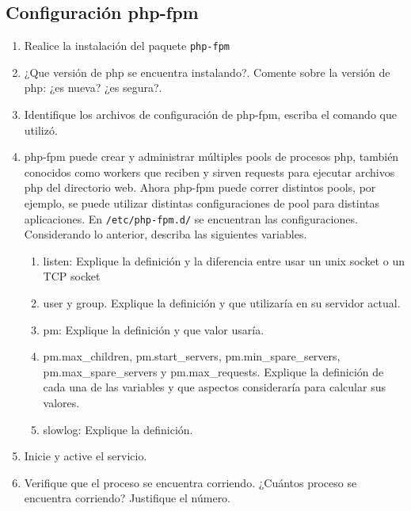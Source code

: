 \documentclass[11pt]{exam}
\begin{document}
\subsection{Configuración php-fpm}
\begin{enumerate}
	\item Realice la instalación del paquete \texttt{php-fpm}
	\item ¿Que versión de php se encuentra instalando?. Comente sobre la versión de php: ¿es nueva? ¿es segura?.
	\vspace{0.9in}
	\item Identifique los archivos de configuración de php-fpm, escriba el comando que utilizó.
	\vspace{0.9in}
	\item php-fpm puede crear y administrar múltiples pools de procesos php, también conocidos como workers que reciben y sirven requests para ejecutar archivos php del directorio web. Ahora php-fpm puede correr distintos pools, por ejemplo, se puede utilizar distintas configuraciones de pool para distintas aplicaciones. En \texttt{/etc/php-fpm.d/} se encuentran las configuraciones. Considerando lo anterior, describa las siguientes variables.
	\begin{enumerate}
		\item listen: Explique la definición y la diferencia entre usar un unix socket o un TCP socket
		\item user y group. Explique la definición y que utilizaría en su servidor actual.
		\item pm: Explique la definición y que valor usaría.
		\item pm.max\_children, pm.start\_servers, pm.min\_spare\_servers, pm.max\_spare\_servers y pm.max\_requests. Explique la definición de cada una de las variables y que aspectos consideraría para calcular sus valores.
		\item slowlog: Explique la definición.
	\end{enumerate}
	\vspace{5in}
	\item Inicie y active el servicio.
	\item Verifique que el proceso se encuentra corriendo. ¿Cuántos proceso se encuentra corriendo? Justifique el número.
\end{enumerate}
\end{document}

